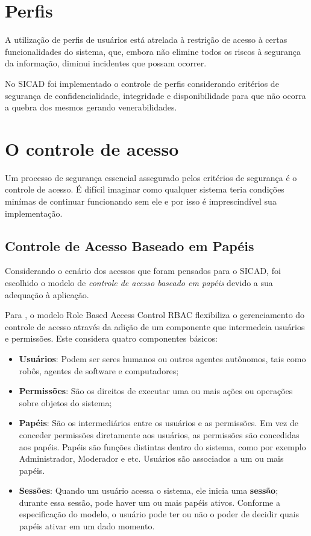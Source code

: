 \documentclass[12pt, a4paper]{report}
\begin{document}
\section{Perfis}
A utilização de perfis de usuários está atrelada à restrição de acesso à certas funcionalidades do sistema, que, embora não elimine todos os riscos à segurança da informação, diminui incidentes que possam ocorrer.


No \ac{SICAD} foi implementado o controle de perfis considerando critérios de segurança de confidencialidade, integridade e disponibilidade para que não ocorra a quebra dos mesmos gerando venerabilidades.

\section{O controle de acesso}
Um processo de segurança essencial assegurado pelos critérios de segurança é o controle de acesso. É difícil imaginar como qualquer sistema teria condições minímas de continuar funcionando sem ele e por isso é imprescindível sua implementação.

\subsection{Controle  de  Acesso  Baseado  em  Papéis}
Considerando o cenário dos acessos que foram pensados para o \ac{SICAD}, foi escolhido o modelo de \textit{controle  de  acesso  baseado  em  papéis} devido a sua adequação à aplicação.

Para \citep{sandhu1997}, o modelo Role Based Access Control \ac{RBAC} flexibiliza o gerenciamento do controle de acesso através da adição de um componente que intermedeia usuários e permissões. Este considera quatro componentes básicos:
\begin{itemize}
\item \textbf{Usuários}: Podem ser seres humanos ou outros agentes autônomos, tais como robôs, agentes de software e computadores;
\item \textbf{Permissões}: São os direitos de executar uma ou mais ações ou operações sobre objetos do sistema;
\item \textbf{Papéis}: São os intermediários entre os usuários e as permissões. Em vez de conceder permissões diretamente aos usuários, as permissões são concedidas aos papéis. Papéis são funções distintas dentro do sistema, como por exemplo Administrador, Moderador e etc. Usuários são associados a um ou mais papéis.  
\item \textbf{Sessões}: Quando um usuário acessa o sistema, ele inicia uma \textbf{sessão}; durante  essa  sessão, pode haver  um  ou  mais  papéis ativos. Conforme a especificação do modelo, o usuário pode ter ou não o poder de decidir quais papéis ativar em um dado momento.
\end{itemize}
\end{document}
